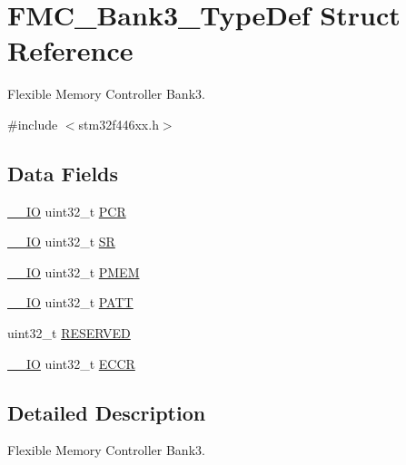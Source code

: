 \hypertarget{struct_f_m_c___bank3___type_def}{}\section{F\+M\+C\+\_\+\+Bank3\+\_\+\+Type\+Def Struct Reference}
\label{struct_f_m_c___bank3___type_def}


Flexible Memory Controller Bank3.  




{\ttfamily \#include $<$stm32f446xx.\+h$>$}

\subsection*{Data Fields}
\begin{DoxyCompactItemize}
\item 
\mbox{\hyperlink{core__sc300_8h_aec43007d9998a0a0e01faede4133d6be}{\+\_\+\+\_\+\+IO}} uint32\+\_\+t \mbox{\hyperlink{struct_f_m_c___bank3___type_def_a6091bd215b74df162dd3bc51621c63ca}{P\+CR}}
\item 
\mbox{\hyperlink{core__sc300_8h_aec43007d9998a0a0e01faede4133d6be}{\+\_\+\+\_\+\+IO}} uint32\+\_\+t \mbox{\hyperlink{struct_f_m_c___bank3___type_def_af6aca2bbd40c0fb6df7c3aebe224a360}{SR}}
\item 
\mbox{\hyperlink{core__sc300_8h_aec43007d9998a0a0e01faede4133d6be}{\+\_\+\+\_\+\+IO}} uint32\+\_\+t \mbox{\hyperlink{struct_f_m_c___bank3___type_def_a64620060ab9533cea56d1c6049fbd612}{P\+M\+EM}}
\item 
\mbox{\hyperlink{core__sc300_8h_aec43007d9998a0a0e01faede4133d6be}{\+\_\+\+\_\+\+IO}} uint32\+\_\+t \mbox{\hyperlink{struct_f_m_c___bank3___type_def_ae95cf98e0ba3414c3d66385b677fcbf1}{P\+A\+TT}}
\item 
uint32\+\_\+t \mbox{\hyperlink{struct_f_m_c___bank3___type_def_a0e5030971ec1bfd3101f83f546493c83}{R\+E\+S\+E\+R\+V\+ED}}
\item 
\mbox{\hyperlink{core__sc300_8h_aec43007d9998a0a0e01faede4133d6be}{\+\_\+\+\_\+\+IO}} uint32\+\_\+t \mbox{\hyperlink{struct_f_m_c___bank3___type_def_abe203f827d2e33c7f162e4170b6dfdb3}{E\+C\+CR}}
\end{DoxyCompactItemize}


\subsection{Detailed Description}
Flexible Memory Controller Bank3. 

